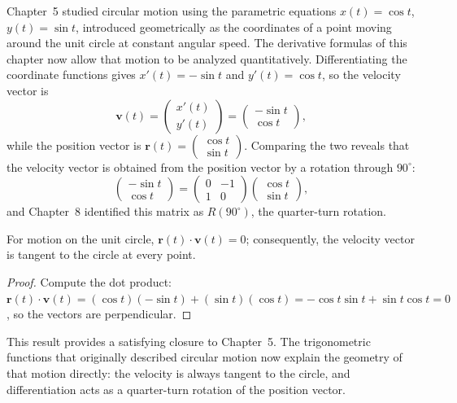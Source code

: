 Chapter~5 studied circular motion using the parametric equations $x(t) =
\cos t$, $y(t) = \sin t$, introduced geometrically as the coordinates of
a point moving around the unit circle at constant angular speed. The
derivative formulas of this chapter now allow that motion to be analyzed
quantitatively. Differentiating the coordinate functions gives $x'(t) =
-\sin t$ and $y'(t) = \cos t$, so the velocity vector is
\[
\mathbf v(t) = \begin{pmatrix} x'(t) \\ y'(t) \end{pmatrix} =
\begin{pmatrix} -\sin t \\ \cos t \end{pmatrix},
\]
while the position vector is $\mathbf r(t) = \begin{pmatrix} \cos t \\
\sin t \end{pmatrix}$. Comparing the two reveals that the velocity
vector is obtained from the position vector by a rotation through
$90^\circ$:
\[
\begin{pmatrix} -\sin t \\ \cos t \end{pmatrix} = \begin{pmatrix} 0 & -1
\\ 1 & 0 \end{pmatrix}\begin{pmatrix} \cos t \\ \sin t \end{pmatrix},
\]
and Chapter~8 identified this matrix as $R(90^\circ)$, the quarter-turn
rotation.

\begin{theorem}
For motion on the unit circle, $\mathbf r(t)\cdot\mathbf v(t) = 0$;
consequently, the velocity vector is tangent to the circle at every
point.
\end{theorem}

\begin{proof}
Compute the dot product: $\mathbf r(t)\cdot\mathbf v(t) = (\cos
t)(-\sin t) + (\sin t)(\cos t) = -\cos t\sin t + \sin t\cos t = 0$, so
the vectors are perpendicular.
\end{proof}

This result provides a satisfying closure to Chapter~5. The trigonometric
functions that originally described circular motion now explain the
geometry of that motion directly: the velocity is always tangent to the
circle, and differentiation acts as a quarter-turn rotation of the
position vector.

